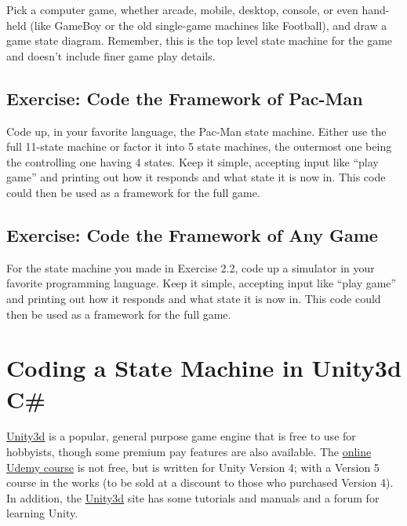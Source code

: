 Pick a computer game, whether arcade, mobile, desktop, console, or even
hand-held (like GameBoy or the old single-game machines like Football),
and draw a game state diagram. Remember, this is the top level state
machine for the game and doesn't include finer game play details.

\subsection[Exercise: Code the Framework of
Pac-Man]{\texorpdfstring{\protect\hypertarget{anchor-10}{}{}Exercise:
Code the Framework of
Pac-Man}{Exercise: Code the Framework of Pac-Man}}\label{exercise-code-the-framework-of-pac-man}

Code up, in your favorite language, the Pac-Man state machine. Either
use the full 11-state machine or factor it into 5 state machines, the
outermost one being the controlling one having 4 states. Keep it simple,
accepting input like ``play game'' and printing out how it responds and
what state it is now in. This code could then be used as a framework for
the full game.

\subsection[Exercise: Code the Framework of Any
Game]{\texorpdfstring{\protect\hypertarget{anchor-11}{}{}Exercise: Code
the Framework of Any
Game}{Exercise: Code the Framework of Any Game}}\label{exercise-code-the-framework-of-any-game}

For the state machine you made in Exercise 2.2, code up a simulator in
your favorite programming language. Keep it simple, accepting input like
``play game'' and printing out how it responds and what state it is now
in. This code could then be used as a framework for the full game.

\section[Coding a State Machine in Unity3d
C\#]{\texorpdfstring{\protect\hypertarget{anchor-12}{}{}Coding a State
Machine in Unity3d
C\#}{Coding a State Machine in Unity3d C\#}}\label{coding-a-state-machine-in-unity3d-c}

\href{https://unity3d.com/}{Unity3d} is a popular, general purpose game
engine that is free to use for hobbyists, though some premium pay
features are also available. The
\href{https://www.udemy.com/unitycourse/learn/v4/}{online Udemy course}
is not free, but is written for Unity Version 4; with a Version 5 course
in the works (to be sold at a discount to those who purchased Version
4). In addition, the \href{https://unity3d.com/}{Unity3d} site has some
tutorials and manuals and a forum for learning Unity.

